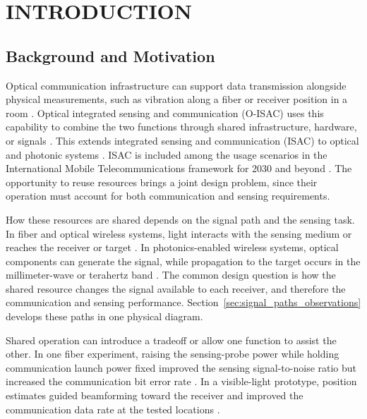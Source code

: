\section{INTRODUCTION}
\label{sec:introduction}

\subsection{Background and Motivation}

Optical communication infrastructure can support data transmission alongside
physical measurements, such as vibration along a fiber or receiver position
in a room \cite{OISAC_SCR00057,OISAC_SCR00196}.
Optical integrated sensing and communication (O-ISAC) uses this capability to
combine the two functions through shared infrastructure, hardware, or signals
\cite{OISAC_SCR00013,Mohsan2026OISACReview}.
This extends integrated sensing and communication (ISAC) to optical and
photonic systems \cite{Zhang2026ISACEvolution}.
ISAC is included among the usage scenarios in the International Mobile
Telecommunications framework for 2030 and beyond \cite{ITUR_M2160_2023}.
The opportunity to reuse resources brings a joint design problem, since their
operation must account for both communication and sensing requirements.

How these resources are shared depends on the signal path and the sensing
task. In fiber and optical wireless systems, light interacts with the sensing
medium or reaches the receiver or target
\cite{OISAC_SCR00013,OISAC_SCR00916,OISAC_SCR01085}.
In photonics-enabled wireless systems, optical components can generate the signal,
while propagation to the target occurs in the millimeter-wave or terahertz band
\cite{OISAC_SCR00036,OISAC_SCR00083}.
The common design question is how the shared resource changes the signal
available to each receiver, and therefore the communication and sensing
performance. Section~\ref{sec:signal_paths_observations} develops these paths
in one physical diagram.

Shared operation can introduce a tradeoff or allow one function to assist the
other. In one fiber experiment, raising the sensing-probe power while holding
communication launch power fixed improved the sensing signal-to-noise ratio
but increased the communication bit error rate \cite{OISAC_SCR00057}.
In a visible-light prototype, position estimates guided beamforming toward the
receiver and improved the communication data rate at the tested locations
\cite{OISAC_SCR00196}.

